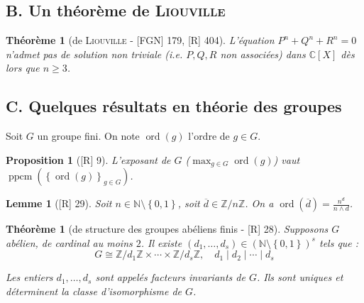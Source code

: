 \documentclass[10pt, a4paper, parskip=full, twoside, twocolumn]{report}
\newtheorem{theorem}[definition]{Théorème}
\newtheorem{proposition}[definition]{Proposition}
\newtheorem{lemma}[definition]{Lemme}
\newcommand{\IN}{\mathbb{N}}
\newcommand{\IZ}{\mathbb{Z}}
\newcommand{\IZnZ}{\mathbb{Z}/n\mathbb{Z}}
\newcommand{\IC}{\mathbb{C}}
\DeclareMathOperator{\ppcm}{ppcm}
\DeclareMathOperator{\ord}{ord}
\begin{document}
\subsection*{B. Un théorème de \textsc{Liouville}}

\begin{tcolorbox}[
    breakable, %
    colback=developpement, %
    colframe=gray!0!black, %
    boxrule=0pt, %
    arc=1mm, %
	boxsep=0pt,
	left=0pt, right=0pt, top=0pt, bottom=0pt
]
\begin{theorem}[de \textsc{Liouville} - \textnormal{[FGN] 179, [R] 404}]
	\label{142dev2}
	L'équation $P^n+Q^n + R^n = 0$ n'admet 
	pas de solution non triviale (\emph{i.e.} $P,Q,R$ non associées) dans 
	$\IC[X]$ dès lors que $n\geq 3$.
\end{theorem}
\end{tcolorbox}

\subsection*{C. Quelques résultats en théorie des groupes}

\textcolor{paragraphtext}{Soit $G$ un groupe fini. On note $\ord(g)$ l'ordre de $g\in G$.}

\begin{proposition}[\textnormal{[R] 9}]
	L'exposant de $G$ ($\max_{g\in G} \ord(g)$) vaut $\ppcm\left(\left\{\ord(g)\right\}_{g\in G}\right)$.
\end{proposition}

\begin{lemma}[\textnormal{[R] 29}]
	Soit $n\in \IN\setminus\left\{0,1\right\}$, soit $\overline{d}\in\IZnZ$.
	On a $\ord(\overline{d}) = \frac{n^d}{n\wedge d}$.
\end{lemma}

\begin{theorem}[de structure des groupes abéliens finis - \textnormal{[R] 28}]
	Supposons $G$ abélien, de cardinal au moins $2$. Il existe 
	$(d_1, \dots, d_s)\in \left(\IN\setminus \left\{0,1\right\}\right)^s$ tels que :
	$$G \cong \IZ/d_1\IZ \times \cdots \times \IZ/d_s\IZ,\quad d_1 \mid d_2 \mid \cdots \mid d_s$$

	Les entiers $d_1,\dots,d_s$ sont appelés \emph{facteurs invariants de $G$}. Ils sont uniques 
	et déterminent la classe d'isomorphisme de $G$.
\end{theorem}
\end{document}
